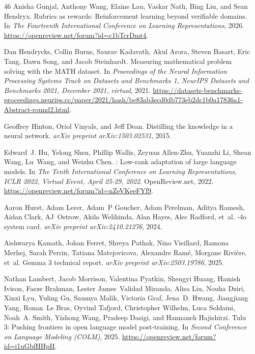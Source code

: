 \begin{thebibliography}{46}
Anisha Gunjal, Anthony Wang, Elaine Lau, Vaskar Nath, Bing Liu, and Sean Hendryx.
\newblock Rubrics as rewards: Reinforcement learning beyond verifiable domains.
\newblock In \emph{The Fourteenth International Conference on Learning Representations}, 2026.
\newblock \url{https://openreview.net/forum?id=c1bTcrDmt4}.

Dan Hendrycks, Collin Burns, Saurav Kadavath, Akul Arora, Steven Basart, Eric Tang, Dawn Song, and Jacob Steinhardt.
\newblock Measuring mathematical problem solving with the {MATH} dataset.
\newblock In \emph{Proceedings of the Neural Information Processing Systems Track on Datasets and Benchmarks 1, NeurIPS Datasets and Benchmarks 2021, December 2021, virtual}, 2021.
\newblock \url{https://datasets-benchmarks-proceedings.neurips.cc/paper/2021/hash/be83ab3ecd0db773eb2dc1b0a17836a1-Abstract-round2.html}.

Geoffrey Hinton, Oriol Vinyals, and Jeff Dean.
\newblock Distilling the knowledge in a neural network.
\newblock \emph{arXiv preprint arXiv:1503.02531}, 2015.

Edward~J. Hu, Yelong Shen, Phillip Wallis, Zeyuan Allen{-}Zhu, Yuanzhi Li, Shean Wang, Lu~Wang, and Weizhu Chen.
: Low-rank adaptation of large language models.
\newblock In \emph{The Tenth International Conference on Learning Representations, {ICLR} 2022, Virtual Event, April 25-29, 2022}. OpenReview.net, 2022.
\newblock \url{https://openreview.net/forum?id=nZeVKeeFYf9}.

Aaron Hurst, Adam Lerer, Adam~P Goucher, Adam Perelman, Aditya Ramesh, Aidan Clark, AJ~Ostrow, Akila Welihinda, Alan Hayes, Alec Radford, et~al.
-4o system card.
\newblock \emph{arXiv preprint arXiv:2410.21276}, 2024.

Aishwarya Kamath, Johan Ferret, Shreya Pathak, Nino Vieillard, Ramona Merhej, Sarah Perrin, Tatiana Matejovicova, Alexandre Ram{\'e}, Morgane Rivi{\`e}re, et~al.
\newblock Gemma 3 technical report.
\newblock \emph{arXiv preprint arXiv:2503.19786}, 2025.

Nathan Lambert, Jacob Morrison, Valentina Pyatkin, Shengyi Huang, Hamish Ivison, Faeze Brahman, Lester James~Validad Miranda, Alisa Liu, Nouha Dziri, Xinxi Lyu, Yuling Gu, Saumya Malik, Victoria Graf, Jena~D. Hwang, Jiangjiang Yang, Ronan~Le Bras, Oyvind Tafjord, Christopher Wilhelm, Luca Soldaini, Noah~A. Smith, Yizhong Wang, Pradeep Dasigi, and Hannaneh Hajishirzi.
\newblock Tulu 3: Pushing frontiers in open language model post-training.
\newblock In \emph{Second Conference on Language Modeling (COLM)}, 2025.
\newblock \url{https://openreview.net/forum?id=i1uGbfHHpH}.


\end{thebibliography}
